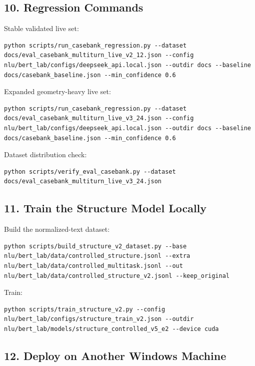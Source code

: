 \documentclass[11pt,a4paper]{ctexart}
\begin{document}
\subsection*{10. Regression Commands}

Stable validated live set:

\begin{verbatim}
python scripts/run_casebank_regression.py --dataset docs/eval_casebank_multiturn_live_v2_12.json --config nlu/bert_lab/configs/deepseek_api.local.json --outdir docs --baseline docs/casebank_baseline.json --min_confidence 0.6
\end{verbatim}

Expanded geometry-heavy live set:

\begin{verbatim}
python scripts/run_casebank_regression.py --dataset docs/eval_casebank_multiturn_live_v3_24.json --config nlu/bert_lab/configs/deepseek_api.local.json --outdir docs --baseline docs/casebank_baseline.json --min_confidence 0.6
\end{verbatim}

Dataset distribution check:

\begin{verbatim}
python scripts/verify_eval_casebank.py --dataset docs/eval_casebank_multiturn_live_v3_24.json
\end{verbatim}

\subsection*{11. Train the Structure Model Locally}

Build the normalized-text dataset:

\begin{verbatim}
python scripts/build_structure_v2_dataset.py --base nlu/bert_lab/data/controlled_structure.jsonl --extra nlu/bert_lab/data/controlled_multitask.jsonl --out nlu/bert_lab/data/controlled_structure_v2.jsonl --keep_original
\end{verbatim}

Train:

\begin{verbatim}
python scripts/train_structure_v2.py --config nlu/bert_lab/configs/structure_train_v2.json --outdir nlu/bert_lab/models/structure_controlled_v5_e2 --device cuda
\end{verbatim}

\subsection*{12. Deploy on Another Windows Machine}
\end{document}
